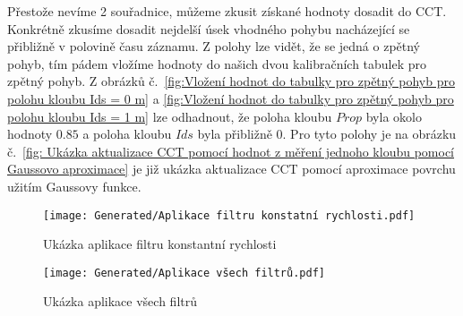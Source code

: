 \par
Přestože nevíme 2 souřadnice, můžeme zkusit získané hodnoty dosadit do CCT. Konkrétně zkusíme dosadit nejdelší úsek vhodného pohybu nacházející se přibližně v polovině času záznamu. Z polohy lze vidět, že se jedná o zpětný pohyb, tím pádem vložíme hodnoty do našich dvou kalibračních tabulek pro zpětný pohyb. Z obrázků č.~\ref{fig:Vložení hodnot do tabulky pro zpětný pohyb pro polohu kloubu Ids = 0 m} a \ref{fig:Vložení hodnot do tabulky pro zpětný pohyb pro polohu kloubu Ids = 1 m} lze odhadnout, že poloha kloubu $Prop$ byla okolo hodnoty $0.85$ a poloha kloubu $Ids$ byla přibližně $0$. Pro tyto polohy je na obrázku č.~\ref{fig: Ukázka aktualizace CCT pomocí hodnot z měření jednoho kloubu pomocí Gaussovo aproximace} je již ukázka aktualizace CCT pomocí aproximace povrchu užitím Gaussovy funkce.

\begin{landscapeimagepage}
    \vspace*{\fill}
    \begin{figure}[H]
        \centering
        \texttt{[image: Generated/Aplikace filtru konstatní rychlosti.pdf]}
        \caption{Ukázka aplikace filtru konstantní rychlosti}
        \label{fig:Ukázka aplikace filtru konstantní rychlosti}
    \end{figure}
    \vspace*{\fill}
\end{landscapeimagepage}

\begin{landscapeimagepage}
    \vspace*{\fill}
    \begin{figure}[H]
        \centering
        \texttt{[image: Generated/Aplikace všech filtrů.pdf]}
        \caption{Ukázka aplikace všech filtrů}
        \label{fig:Ukázka aplikace všech filrů}
    \end{figure}
    \vspace*{\fill}
\end{landscapeimagepage}

